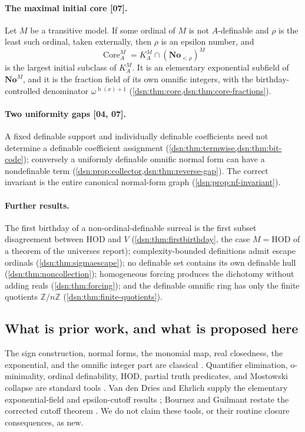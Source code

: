 \documentclass[11pt,a4paper]{article}
\numberwithin{equation}{section}
\theoremstyle{definition}
\theoremstyle{remark}
\newcommand{\No}{\mathbf{No}}
\newcommand{\HOD}{\mathrm{HOD}}
\newcommand{\Z}{\mathbb Z}
\newcommand{\bd}{\operatorname{b}}
\newcommand{\Core}{\operatorname{Core}}
\newcommand{\src}[1]{\textup{\textsf{\small[#1]}}}
\begin{document}
\paragraph{The maximal initial core \src{07}.}
Let $M$ be a transitive model. If some ordinal of $M$ is not
$A$-definable and $\rho$ is the least such ordinal, taken externally, then
$\rho$ is an epsilon number, and
\[
 \Core^M_A=K^M_A\cap(\No_{<\rho})^M
\]
is the largest initial subclass of $K^M_A$. It is an elementary
exponential subfield of $\No^M$, and it is the fraction field of its own
omnific integers, with the birthday-controlled denominator
$\omega^{\bd(x)+1}$ (\cref{dsn:thm:core,dsn:thm:core-fractions}).

\paragraph{Two uniformity gaps \src{04, 07}.}
A fixed definable support and individually definable coefficients need not
determine a definable coefficient assignment
(\cref{dsn:thm:termwise,dsn:thm:bit-code}); conversely a uniformly
definable omnific normal form can have a nondefinable term
(\cref{dsn:prop:collector,dsn:thm:reverse-gap}). The correct invariant is
the entire canonical normal-form graph (\cref{dsn:prop:nf-invariant}).

\paragraph{Further results.}
The first birthday of a non-ordinal-definable surreal is the first
subset disagreement between $\HOD$ and $V$ (\cref{dsn:thm:firstbirthday},
the case $M=\HOD$ of a theorem of the universes report);
complexity-bounded definitions admit escape ordinals
(\cref{dsn:thm:sigmaescape}); no definable set contains its own definable
hull (\cref{dsn:thm:noncollection}); homogeneous forcing produces the
dichotomy without adding reals (\cref{dsn:thm:forcing}); and the
definable omnific ring has only the finite quotients $\Z/n\Z$
(\cref{dsn:thm:finite-quotients}).

\subsection{What is prior work, and what is proposed here}

The sign construction, normal forms, the monomial map, real closedness,
the exponential, and the omnific integer part are classical
\cite{Conway,Gonshor,vdDE,vdDEerr,LM}. Quantifier elimination, o-minimality,
ordinal definability, HOD, partial truth predicates, and Mostowski
collapse are standard tools \cite{Marker,vddTame,Jech,HLR}. Van den Dries
and Ehrlich supply the elementary exponential-field and epsilon-cutoff
results \cite{vdDE,vdDEerr}; Bournez and Guilmant restate the corrected
cutoff theorem \cite{BG}. We do not claim these tools, or their routine
closure consequences, as new.
\end{document}

